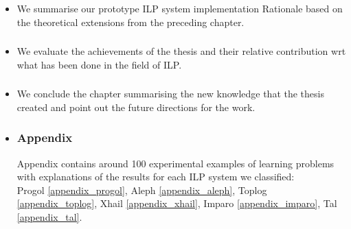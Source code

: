 \begin{itemize}
\item \subsubsection{}
We summarise our prototype ILP system implementation Rationale based on the theoretical extensions from the preceding chapter.
\item \subsubsection{}
We evaluate the achievements of the thesis and their relative contribution wrt what has been done in the field of ILP.
\item \subsubsection{}
We conclude the chapter summarising the new knowledge that the thesis created and point out the future directions for the work.
\item \subsubsection{Appendix}
Appendix contains around 100 experimental examples of learning problems with explanations of the results for each ILP system we classified:\\
Progol \ref{appendix_progol},
Aleph \ref{appendix_aleph},
Toplog \ref{appendix_toplog},  
Xhail \ref{appendix_xhail},
Imparo \ref{appendix_imparo},
Tal \ref{appendix_tal}.
\end{itemize}